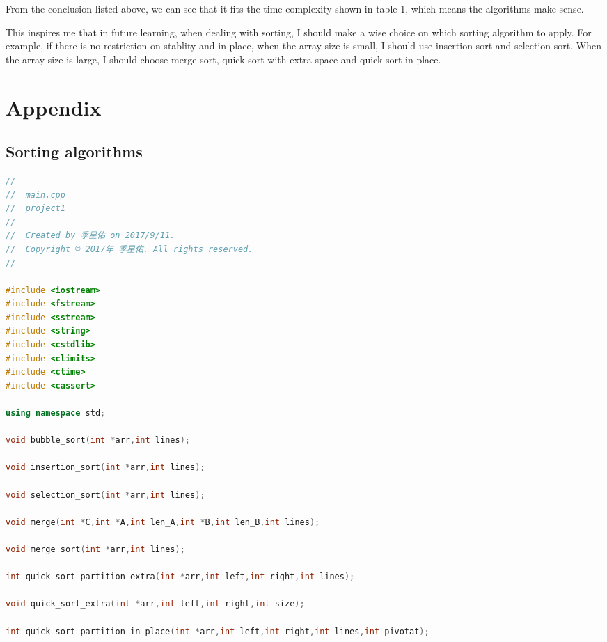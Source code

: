 \documentclass{article}
\begin{document}
\begin{spacing}{2.0}
From the conclusion listed above, we can see that it fits the time complexity shown in table 1, which means the algorithms make sense.

This inspires me that in future learning, when dealing with sorting, I should make a wise choice on which sorting algorithm to apply. For example, if there is no restriction on stablity and in place, when the array size is small, I should use insertion sort and selection sort. When the array size is large, I should choose merge sort, quick sort with extra space and quick sort in place.
\section{Appendix}
\subsection{Sorting algorithms}
\begin{lstlisting}[language=c++]
//
//  main.cpp
//  project1
//
//  Created by 季星佑 on 2017/9/11.
//  Copyright © 2017年 季星佑. All rights reserved.
//

#include <iostream>
#include <fstream>
#include <sstream>
#include <string>
#include <cstdlib>
#include <climits>
#include <ctime>
#include <cassert>

using namespace std;

void bubble_sort(int *arr,int lines);

void insertion_sort(int *arr,int lines);

void selection_sort(int *arr,int lines);

void merge(int *C,int *A,int len_A,int *B,int len_B,int lines);

void merge_sort(int *arr,int lines);

int quick_sort_partition_extra(int *arr,int left,int right,int lines);

void quick_sort_extra(int *arr,int left,int right,int size);

int quick_sort_partition_in_place(int *arr,int left,int right,int lines,int pivotat);


\end{lstlisting}
\end{spacing}
\end{document}
